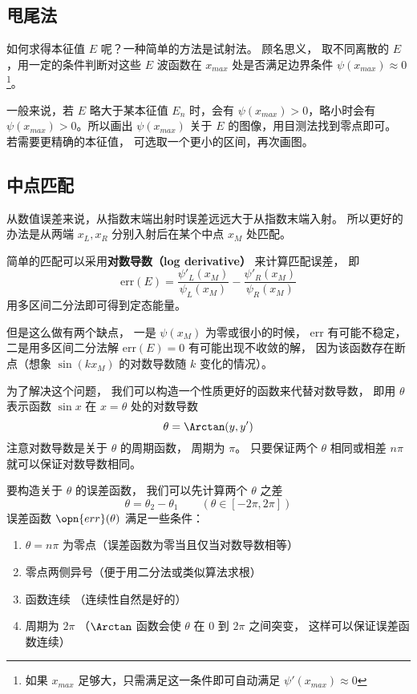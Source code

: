 \subsection{甩尾法}
如何求得本征值 $E$ 呢？一种简单的方法是试射法。 顾名思义， 取不同离散的 $E$，用一定的条件判断对这些 $E$ 波函数在 $x_{max}$ 处是否满足边界条件 $\psi(x_{max}) \approx 0$\footnote{如果 $x_{max}$ 足够大，只需满足这一条件即可自动满足 $\psi'(x_{max})\approx 0$}。

一般来说，若 $E$ 略大于某本征值 $E_n$ 时，会有 $\psi(x_{max})>0$，略小时会有 $\psi(x_{max})>0$。所以画出 $\psi(x_{max})$ 关于 $E$ 的图像，用目测法找到零点即可。 若需要更精确的本征值， 可选取一个更小的区间，再次画图。

\subsection{中点匹配}
从数值误差来说，从指数末端出射时误差远远大于从指数末端入射。 所以更好的办法是从两端 $x_L, x_R$ 分别入射后在某个中点 $x_M$ 处匹配。

简单的匹配可以采用\textbf{对数导数（log derivative）} 来计算匹配误差， 即
\begin{equation}
\text{err}(E) = \frac{\psi'_L(x_M)}{\psi_L(x_M)} - \frac{\psi'_R(x_M)}{\psi_R(x_M)}
\end{equation}
用多区间二分法即可得到定态能量。

但是这么做有两个缺点， 一是 $\psi(x_M)$ 为零或很小的时候， err 有可能不稳定， 二是用多区间二分法解 $\text{err}(E) = 0$ 有可能出现不收敛的解， 因为该函数存在断点（想象 $\sin(k x_M)$ 的对数导数随 $k$ 变化的情况）。

为了解决这个问题， 我们可以构造一个性质更好的函数来代替对数导数， 即用 $\theta$ 表示函数 $\sin x$ 在 $x = \theta$ 处的对数导数
\begin{equation}
\theta = \Arctan(y, y')
\end{equation}
注意对数导数是关于 $\theta$ 的周期函数， 周期为 $\pi$。 只要保证两个 $\theta$ 相同或相差 $n\pi$ 就可以保证对数导数相同。

要构造关于 $\theta$ 的误差函数， 我们可以先计算两个 $\theta$ 之差
\begin{equation}
\theta = \theta_2 - \theta_1 \qquad (\theta \in [-2\pi, 2\pi])
\end{equation}
误差函数 $\opn{err}(\theta)$ 满足一些条件：
\begin{enumerate}
\item $\theta = n\pi$ 为零点（误差函数为零当且仅当对数导数相等）
\item 零点两侧异号（便于用二分法或类似算法求根）
\item 函数连续 （连续性自然是好的）
\item 周期为 $2\pi$ （$\Arctan$ 函数会使 $\theta$ 在 0 到 $2\pi$ 之间突变， 这样可以保证误差函数连续）
\end{enumerate}

